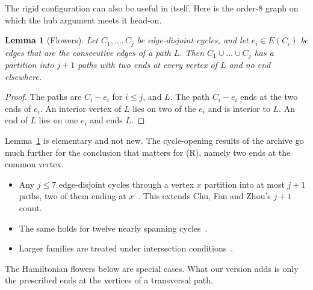 \documentclass[11pt]{amsart}
\newtheorem{lemma}[theorem]{Lemma}
\theoremstyle{definition}
\begin{document}
The rigid configuration can also be useful in itself. Here is the order-$8$ graph on which the
hub argument meets it head-on.

\begin{lemma}[Flowers]\label{lem:flower}
Let $C_1,\dots,C_j$ be edge-disjoint cycles, and let $e_i\in E(C_i)$ be edges that are the
consecutive edges of a path $L$. Then $C_1\cup\dots\cup C_j$ has a partition into $j+1$ paths with
two ends at every vertex of $L$ and no end elsewhere.
\end{lemma}
\begin{proof}
The paths are $C_i-e_i$ for $i\le j$, and $L$. The path $C_i-e_i$ ends at the two ends of $e_i$.
An interior vertex of $L$ lies on two of the $e_i$ and is interior to $L$. An end of $L$ lies on
one $e_i$ and ends $L$.
\end{proof}
Lemma~\ref{lem:flower} is elementary and not new. The cycle-opening results of the archive go
much further for the conclusion that matters for (R), namely two ends at the common vertex.
\begin{itemize}
\item Any $j\le7$ edge-disjoint cycles through a vertex $x$ partition into at most $j+1$ paths,
two of them ending at $x$~\cite[Thm.~38]{MR}. This extends Chu, Fan and Zhou's $j+1$ count.
\item The same holds for twelve nearly spanning cycles~\cite[Thm.~1]{CC}.
\item Larger families are treated under intersection conditions~\cite[Thm.~13.18]{SP}.
\end{itemize}
The Hamiltonian flowers below are special cases. What our version adds is only the prescribed
ends at the vertices of a transversal path.
\end{document}
